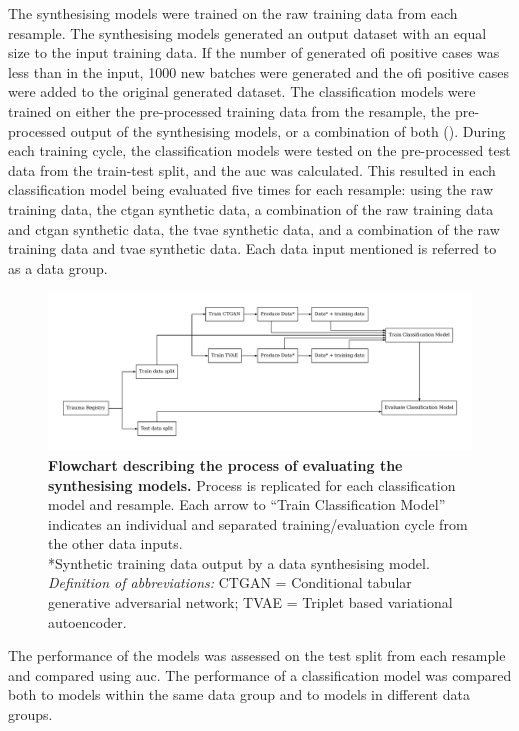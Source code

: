 \documentclass[12pt, a4paper]{article}
\begin{document}
The synthesising models were trained on the raw training data from each resample. The synthesising models generated an
output dataset with an equal size to the input training data. If the number of generated \acrshort{ofi} positive cases
was less than in the input, 1000 new batches were generated and the \acrshort{ofi} positive cases were added to the
original generated dataset. The classification models were trained on either the pre-processed training data from the
resample, the pre-processed output of the synthesising models, or a combination of both ().
During each training cycle, the classification models were tested on the pre-processed test data from the train-test
split, and the \acrshort{auc} was calculated. This resulted in each classification model being evaluated five times for
each resample: using the raw training data, the \acrshort{ctgan} synthetic data, a combination of the raw training data
and \acrshort{ctgan} synthetic data, the \acrshort{tvae} synthetic data, and a combination of the raw training data and
\acrshort{tvae} synthetic data. Each data input mentioned is referred to as a data group.

\begin{figure}
	\centering
	\includegraphics[width=\textwidth]{figures/model_flowchart.pdf}
	\caption{\textbf{Flowchart describing the process of evaluating the synthesising models.}
		Process is replicated for each classification model and resample. Each arrow to ``Train Classification Model''
		indicates an individual and separated training/evaluation cycle from the other data inputs.\\
		*Synthetic training data output by a data synthesising model.\\
		\textit{Definition of abbreviations:} CTGAN = Conditional tabular generative adversarial network;
		TVAE = Triplet based variational autoencoder.}%
	\label{fig:modelflowchart}
\end{figure}

The performance of the models was assessed on the test split from each resample and compared using \acrshort{auc}. The
performance of a classification model was compared both to models within the same data group and to models in different
data groups.
\end{document}
